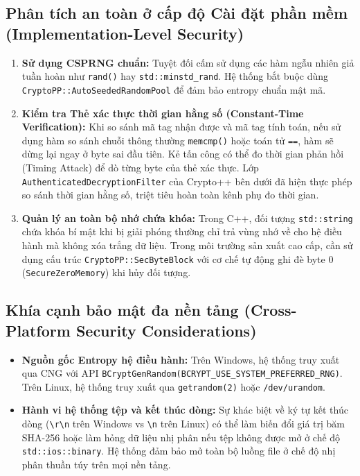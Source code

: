 \documentclass[12pt, a4paper]{report}
\begin{document}
\subsection{Phân tích an toàn ở cấp độ Cài đặt phần mềm (Implementation-Level Security)}
\begin{enumerate}
    \item \textbf{Sử dụng CSPRNG chuẩn:} Tuyệt đối cấm sử dụng các hàm ngẫu nhiên giả tuần hoàn như \texttt{rand()} hay \texttt{std::minstd\_rand}. Hệ thống bắt buộc dùng \texttt{CryptoPP::AutoSeededRandomPool} để đảm bảo entropy chuẩn mật mã.
    \item \textbf{Kiểm tra Thẻ xác thực thời gian hằng số (Constant-Time Verification):} Khi so sánh mã tag nhận được và mã tag tính toán, nếu sử dụng hàm so sánh chuỗi thông thường \texttt{memcmp()} hoặc toán tử \texttt{==}, hàm sẽ dừng lại ngay ở byte sai đầu tiên. Kẻ tấn công có thể đo thời gian phản hồi (Timing Attack) để dò từng byte của thẻ xác thực. Lớp \texttt{AuthenticatedDecryptionFilter} của Crypto++ bên dưới đã hiện thực phép so sánh thời gian hằng số, triệt tiêu hoàn toàn kênh phụ đo thời gian.
    \item \textbf{Quản lý an toàn bộ nhớ chứa khóa:} Trong C++, đối tượng \texttt{std::string} chứa khóa bí mật khi bị giải phóng thường chỉ trả vùng nhớ về cho hệ điều hành mà không xóa trắng dữ liệu. Trong môi trường sản xuất cao cấp, cần sử dụng cấu trúc \texttt{CryptoPP::SecByteBlock} với cơ chế tự động ghi đè byte 0 (\texttt{SecureZeroMemory}) khi hủy đối tượng.
\end{enumerate}

\subsection{Khía cạnh bảo mật đa nền tảng (Cross-Platform Security Considerations)}
\begin{itemize}
    \item \textbf{Nguồn gốc Entropy hệ điều hành:} Trên Windows, hệ thống truy xuất qua CNG với API \texttt{BCryptGenRandom(BCRYPT\_USE\_SYSTEM\_PREFERRED\_RNG)}. Trên Linux, hệ thống truy xuất qua \texttt{getrandom(2)} hoặc \texttt{/dev/urandom}.
    \item \textbf{Hành vi hệ thống tệp và kết thúc dòng:} Sự khác biệt về ký tự kết thúc dòng (\texttt{\textbackslash r\textbackslash n} trên Windows vs \texttt{\textbackslash n} trên Linux) có thể làm biến đổi giá trị băm SHA-256 hoặc làm hỏng dữ liệu nhị phân nếu tệp không được mở ở chế độ \texttt{std::ios::binary}. Hệ thống đảm bảo mở toàn bộ luồng file ở chế độ nhị phân thuần túy trên mọi nền tảng.
\end{itemize}
\end{document}
